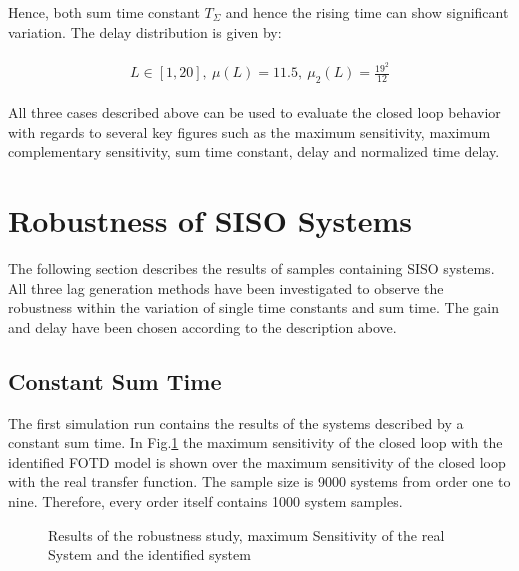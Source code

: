 Hence, both sum time constant $T_\Sigma$ and hence the rising time can show significant variation. The delay distribution is given by:

\begin{align*}
\begin{split}
L \in \left[ 1 , 20 \right],~\mu\left( L \right) = 11.5 ,~\mu_2\left(L\right) = \frac{19^2}{12}
\end{split}
\end{align*}

All three cases described above can be used to evaluate the closed loop behavior with regards to several key figures such as the maximum sensitivity, maximum complementary sensitivity, sum time constant, delay and normalized time delay.

\newpage
\section{Robustness of SISO Systems} %
\label{c:montecarlo:s:siso}

The following section describes the results of samples containing SISO systems. All three lag generation methods have been investigated to observe the robustness within the variation of single time constants and sum time. The gain and delay have been chosen according to the description above.

\subsection{Constant Sum Time}
\label{c:montecarlo:ss:siso_constant}

The first simulation run contains the results of the systems described by a constant sum time. In Fig.\ref{c:montecarlo:f:robustness_tsum} the maximum sensitivity of the closed loop with the identified FOTD model is shown over the maximum  sensitivity of the closed loop with the real transfer function. The sample size is 9000 systems from order one to nine. Therefore, every order itself contains 1000 system samples. 

\begin{figure}[H]\centering

\caption{Results of the robustness study, maximum Sensitivity of the real System and the identified system}
\label{c:montecarlo:f:robustness_tsum}
\end{figure}

